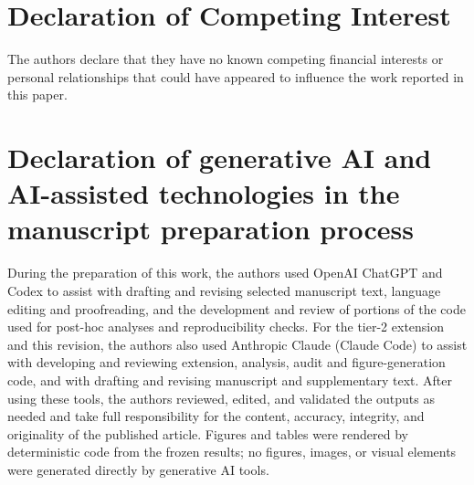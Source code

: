 \documentclass[5p,twocolumn]{elsarticle}
\begin{document}
\section*{Declaration of Competing Interest}

The authors declare that they have no known competing financial interests or
personal relationships that could have appeared to influence the work reported
in this paper.

\section*{Declaration of generative AI and AI-assisted technologies in the manuscript preparation process}

During the preparation of this work, the authors used OpenAI ChatGPT and Codex
to assist with drafting and revising selected manuscript text, language editing
and proofreading, and the development and review of portions of the code used
for post-hoc analyses and reproducibility checks. For the tier-2 extension and
this revision, the authors also used Anthropic Claude (Claude Code) to assist
with developing and reviewing extension, analysis, audit and
figure-generation code, and with drafting and revising manuscript and
supplementary text. After using these tools, the
authors reviewed, edited, and validated the outputs as needed and take full
responsibility for the content, accuracy, integrity, and originality of the
published article. Figures and tables were rendered by deterministic code
from the frozen results; no figures, images, or visual elements were
generated directly by generative AI tools.




\end{document}
